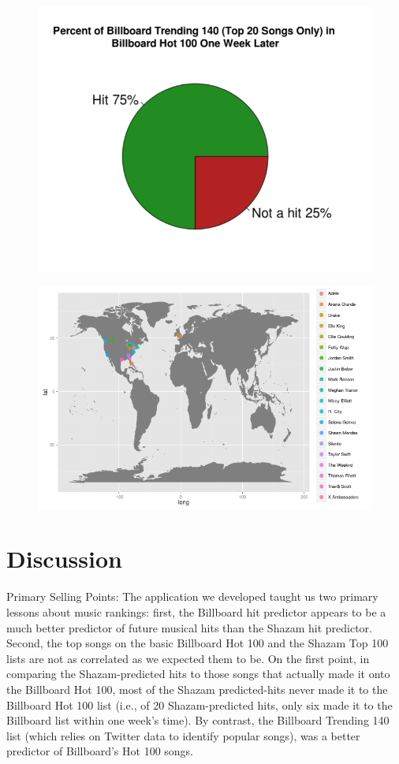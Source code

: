 \documentclass{article}
\begin{document}
\begin{figure}[hp]
  \centering
    \includegraphics[scale=0.5]{4}
\end{figure}   
\begin{figure}[hp]
  \centering
    \includegraphics[scale=0.6]{ArtistMap}
\end{figure}


\section{Discussion}

Primary Selling Points:  The application we developed taught us two primary lessons about music rankings:  first, the Billboard hit predictor appears to be a much better predictor of future musical hits than the Shazam hit predictor.  Second, the top songs on the basic Billboard Hot 100 and the Shazam Top 100 lists are not as correlated as we expected them to be.  On the first point, in comparing the Shazam-predicted hits to those songs that actually made it onto the Billboard Hot 100, most of the Shazam predicted-hits never made it to the Billboard Hot 100 list (i.e., of 20 Shazam-predicted hits, only six made it to the Billboard list within one week's time).  By contrast, the Billboard Trending 140 list (which relies on Twitter data to identify popular songs), was a better predictor of Billboard's Hot 100 songs. \vspace{2mm} 
\end{document}
